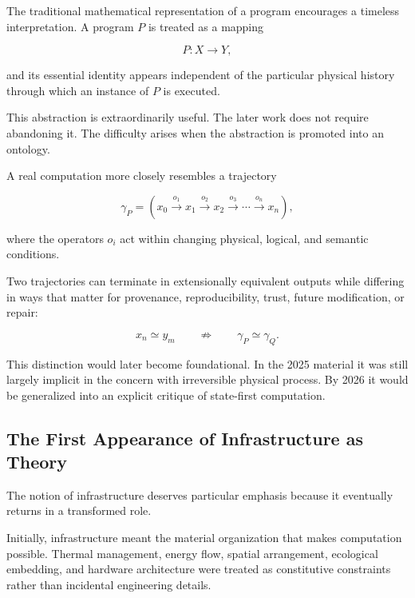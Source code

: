 \documentclass[11pt]{article}
\theoremstyle{remark}
\begin{document}
The traditional mathematical representation of a program encourages a timeless interpretation. A program $P$ is treated as a mapping

\begin{equation}
P : X \rightarrow Y,
\end{equation}

and its essential identity appears independent of the particular physical history through which an instance of $P$ is executed.

This abstraction is extraordinarily useful. The later work does not require abandoning it. The difficulty arises when the abstraction is promoted into an ontology.

A real computation more closely resembles a trajectory

\begin{equation}
\gamma_P
=
\left(
x_0
\xrightarrow{o_1}
x_1
\xrightarrow{o_2}
x_2
\xrightarrow{o_3}
\cdots
\xrightarrow{o_n}
x_n
\right),
\end{equation}

where the operators $o_i$ act within changing physical, logical, and semantic conditions.

Two trajectories can terminate in extensionally equivalent outputs while differing in ways that matter for provenance, reproducibility, trust, future modification, or repair:

\begin{equation}
x_n \simeq y_m
\qquad\not\Rightarrow\qquad
\gamma_P \simeq \gamma_Q.
\end{equation}

This distinction would later become foundational. In the 2025 material it was still largely implicit in the concern with irreversible physical process. By 2026 it would be generalized into an explicit critique of state-first computation.

\subsection{The First Appearance of Infrastructure as Theory}

The notion of infrastructure deserves particular emphasis because it eventually returns in a transformed role.

Initially, infrastructure meant the material organization that makes computation possible. Thermal management, energy flow, spatial arrangement, ecological embedding, and hardware architecture were treated as constitutive constraints rather than incidental engineering details.
\end{document}

